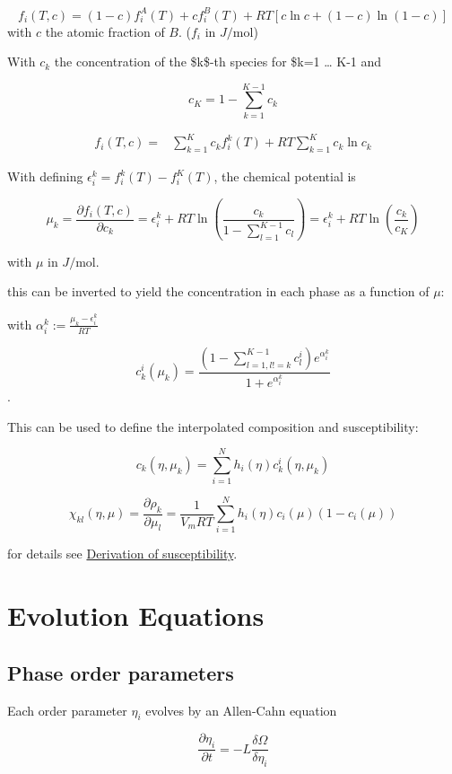 \documentclass[11pt]{article}
\begin{document}
$$
f_i(T,c) = (1-c) f_i^A(T) + c f_i^B(T) + RT \left[ c \ln c + (1-c) \ln (1-c) \right]
$$
with \(c\) the atomic fraction of \(B\). (\(f_i\) in \(J/\text{mol}\))

With \(c_k\) the concentration of the \$k\$-th species for \$k=1 \dots{} K-1 and

$$
c_K = 1 - \sum_{k=1}^{K-1} c_k
$$

\begin{align*}
f_i(T,c) =& \sum_{k=1}^{K} c_k f_i^k(T) + RT \sum_{k=1}^{K} c_k \ln c_k
\end{align*}


With defining \(\epsilon_i^k = f_i^k(T) - f_i^K(T)\), the chemical potential is


$$
\mu_k = \frac{\partial f_i(T,c)}{\partial c_k} = \epsilon_i^k + R T \ln{\left(\frac{c_k}{1-\sum_{l=1}^{K-1} c_l}\right)} = \epsilon_i^k + R T \ln{\left(\frac{c_k}{c_K}\right)}
$$

with \(\mu\) in \(J/\text{mol}\).

this can be inverted to yield the concentration in each phase as a function of \(\mu\):

with \(\alpha_i^k := \frac{\mu_k - \epsilon_i^k}{R T}\)

$$
c_k^i(\mu_k) = \frac{\left(1-\sum_{l=1, l != k}^{K-1} c_l^i \right) e^{\alpha_i^k}}{1 + e^{\alpha_i^k}}
$$.

This can be used to define the interpolated composition and susceptibility:

$$
c_k(\eta, \mu_k) = \sum_{i=1}^N h_i(\eta) c_k^i(\eta, \mu_k)
$$

$$
\chi_{kl}(\eta, \mu) = \frac{\partial \rho_k}{\partial \mu_l} = \frac{1}{V_m R T} \sum_{i=1}^N h_i(\eta) c_i(\mu) (1-c_i(\mu))
$$

for details see \hyperref[sec:org9947c31]{Derivation of susceptibility}.

\section{Evolution Equations}
\label{sec:org99d6c42}

\subsection{Phase order parameters}
\label{sec:org69053db}

Each order parameter \(\eta_i\) evolves by an Allen-Cahn equation

$$
\frac{\partial \eta_i}{\partial t} = -L \frac{\delta \Omega}{\delta \eta_i}
$$
\end{document}
